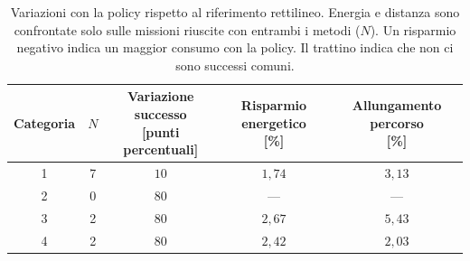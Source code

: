 \begin{table}[H]
\centering
\caption{Variazioni con la policy rispetto al riferimento rettilineo. Energia e distanza sono confrontate solo sulle missioni riuscite con entrambi i metodi ($N$). Un risparmio negativo indica un maggior consumo con la policy. Il trattino indica che non ci sono successi comuni.}
\label{tab:big-map-18m-confronto-variazioni}
\small
\setlength{\tabcolsep}{4pt}
\begin{tabular}{@{}ccccc@{}}
\toprule
Categoria & $N$ & \shortstack{Variazione successo\\{}[punti percentuali]} & \shortstack{Risparmio energetico\\{}[\%]} & \shortstack{Allungamento percorso\\{}[\%]} \\
\midrule
1 & 7 & $10$ & $1{,}74$ & $3{,}13$ \\
2 & 0 & $80$ & --- & --- \\
3 & 2 & $80$ & $2{,}67$ & $5{,}43$ \\
4 & 2 & $80$ & $2{,}42$ & $2{,}03$ \\
\bottomrule
\end{tabular}
\end{table}
